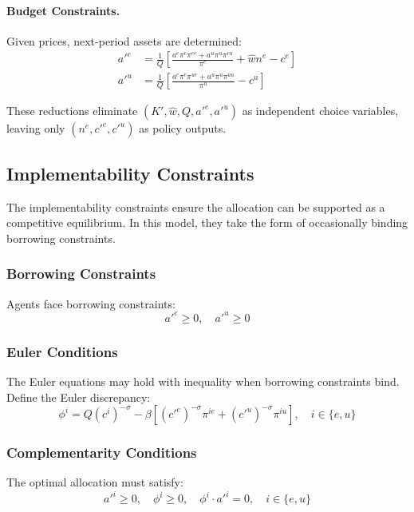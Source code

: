 \paragraph{Budget Constraints.}
Given prices, next-period assets are determined:
\begin{align}
    a'^e &= \frac{1}{Q} \left[ \frac{a^e \pi^e \pi^{ee} + a^u \pi^u \pi^{eu}}{\pi^e} + \hat{w} n^e - c^e \right] \label{eq:asset_e}\\
    a'^u &= \frac{1}{Q} \left[ \frac{a^e \pi^e \pi^{ue} + a^u \pi^u \pi^{uu}}{\pi^u} - c^u \right] \label{eq:asset_u}
\end{align}

These reductions eliminate $(K', \hat{w}, Q, a'^e, a'^u)$ as independent choice variables, leaving only $(n^e, c'^e, c'^u)$ as policy outputs.


\subsection{Implementability Constraints}

The implementability constraints ensure the allocation can be supported as a competitive equilibrium. In this model, they take the form of occasionally binding borrowing constraints.

\subsubsection{Borrowing Constraints}
Agents face borrowing constraints:
\begin{equation}
    a'^e \geq 0, \quad a'^u \geq 0
\end{equation}

\subsubsection{Euler Conditions}
The Euler equations may hold with inequality when borrowing constraints bind. Define the Euler discrepancy:
\begin{equation}\label{eq:euler_discrepancy}
    \phi^i = Q (c^i)^{-\sigma} - \beta \left[ (c'^e)^{-\sigma} \pi^{ie} + (c'^u)^{-\sigma} \pi^{iu} \right], \quad i \in \{e, u\}
\end{equation}

\subsubsection{Complementarity Conditions}
The optimal allocation must satisfy:
\begin{equation}\label{eq:complementarity}
    a'^i \geq 0, \quad \phi^i \geq 0, \quad \phi^i \cdot a'^i = 0, \quad i \in \{e, u\}
\end{equation}

